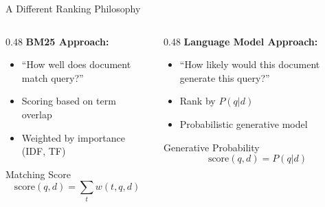 \documentclass[aspectratio=169]{beamer}
\newif\ifanimated
\newcommand{\cpause}{\ifanimated\pause\fi}
\begin{document}
\begin{frame}{A Different Ranking Philosophy}
\begin{columns}
\begin{column}{0.48\textwidth}
\textbf{BM25 Approach:}
\begin{itemize}
    \item ``How well does document match query?''
    \item Scoring based on term overlap
    \item Weighted by importance (IDF, TF)
\end{itemize}

\vspace{0.5em}

\begin{block}{Matching Score}
$$\text{score}(q,d) = \sum_{t} w(t,q,d)$$
\end{block}
\end{column}

\cpause
\begin{column}{0.48\textwidth}
\textbf{Language Model Approach:}
\begin{itemize}
    \item ``How likely would this document generate this query?''
    \item Rank by $P(q|d)$
    \item Probabilistic generative model
\end{itemize}

\vspace{0.5em}

\begin{block}{Generative Probability}
$$\text{score}(q,d) = P(q|d)$$
\end{block}
\end{column}
\end{columns}

\vspace{1em}

\end{frame}
\end{document}
